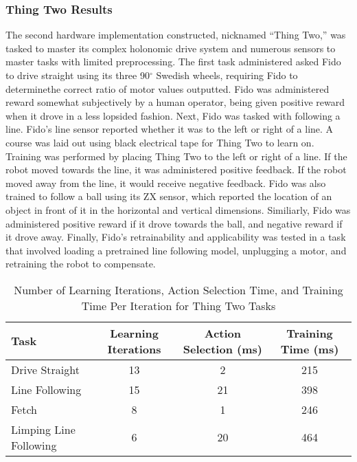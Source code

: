 \subsubsection{Thing Two Results}

The second hardware implementation constructed, nicknamed ``Thing Two,'' was tasked to master its complex holonomic drive system and numerous sensors to master tasks with limited preprocessing.
The first task administered asked Fido to drive straight using its three 90$^{\circ}$ Swedish wheels, requiring Fido to determinethe correct ratio of motor values outputted.
Fido was administered reward somewhat subjectively by a human operator, being given positive reward when it drove in a less lopsided fashion.
Next, Fido was tasked with following a line.
Fido's line sensor reported whether it was to the left or right of a line.
A course was laid out using black electrical tape for Thing Two to learn on.
Training was performed by placing Thing Two to the left or right of a line.
If the robot moved towards the line, it was administered positive feedback.
If the robot moved away from the line, it would receive negative feedback.
Fido was also trained to follow a ball using its ZX sensor, which reported the location of an object in front of it in the horizontal and vertical dimensions.
Similiarly, Fido was administered positive reward if it drove towards the ball, and negative reward if it drove away.
Finally, Fido's retrainability and applicability was tested in a task that involved loading a pretrained line following model, unplugging a motor, and retraining the robot to compensate.

\begin{table}[ht]
	\centering
	\begin{tabular}{@{}lccc@{}}
		\toprule
		Task              & Learning Iterations & Action Selection (ms) & Training Time (ms) \\ \midrule
		Drive Straight         & 13             & 2                     & 215                \\
		Line Following         & 15             & 21                    & 398                \\
		Fetch                  & 8              & 1                     & 246                \\
		Limping Line Following & 6              & 20                    & 464                \\ \bottomrule
	\end{tabular}
	\caption {Number of Learning Iterations, Action Selection Time, and Training Time Per Iteration for Thing Two Tasks} \label{tab:thingtworesults}
\end{table}

